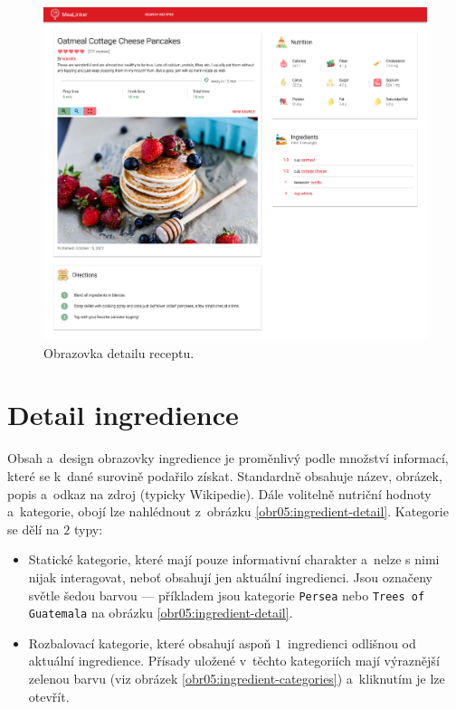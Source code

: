 \begin{figure}[h!]\centering
\includegraphics[width=140mm]{../img/recipe-detail}
\caption{Obrazovka detailu receptu.}
\label{obr05:recipe-detail}
\end{figure}

\section{Detail ingredience}

Obsah a~design obrazovky ingredience je proměnlivý podle množství informací, které se k~dané surovině podařilo získat. Standardně obsahuje název, obrázek, popis a~odkaz na zdroj (typicky Wikipedie). Dále volitelně nutriční hodnoty a~kategorie, obojí lze nahlédnout z~obrázku \ref{obr05:ingredient-detail}. Kategorie se dělí na $2$ typy:
\begin{itemize}
    \item Statické kategorie, které mají pouze informativní charakter a~nelze s nimi nijak interagovat, neboť obsahují jen aktuální ingredienci. Jsou označeny světle šedou barvou --- příkladem jsou kategorie \texttt{Persea} nebo \texttt{Trees of Guatemala} na obrázku \ref{obr05:ingredient-detail}.
    \item Rozbalovací kategorie, které obsahují aspoň $1$~ingredienci odlišnou od aktuální ingredience. Přísady uložené v~těchto kategoriích mají výraznější zelenou barvu (viz obrázek \ref{obr05:ingredient-categories}) a~kliknutím je lze otevřít.
\end{itemize}

